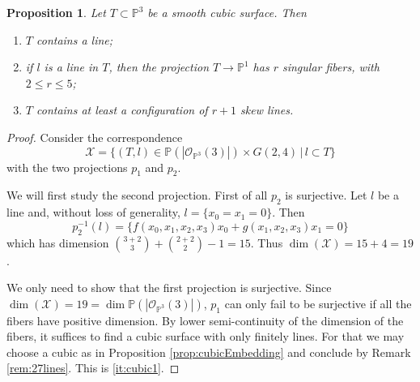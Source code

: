 \documentclass[a4paper,11pt]{amsart}
\newtheorem{proposition}[theorem]{Proposition}
\def\dim{\operatorname{dim}}
\newcommand{\OO}{\mathcal{O}}
\newcommand{\PP}{\mathbb{P}}
\begin{document}
\begin{proposition}\label{prop:cubic}
	Let $T \subset \PP^3$ be a smooth cubic surface.
	Then
	\begin{enumerate}
		\item\label{it:cubic1} $T$ contains a line;
		\item\label{it:cubic2} if $l$ is a line in $T$, then the projection $T \to \PP^1$ has $r$ singular fibers, with $2\leq r\leq 5$;
		\item\label{it:cubic3} $T$ contains at least a configuration of $r+1$ skew lines.
	\end{enumerate}
\end{proposition}

\begin{proof}
	Consider the correspondence
	\[
	\mathcal{X} = \big\{(T,l) \in \PP\left(|\OO_{\PP^3}(3)|\right) \times G(2,4) \,\big|\, l\subset T \big\}
	\]
	with the two projections $p_1$ and $p_2$.
	
	We will first study the second projection.
	First of all $p_2$ is surjective.
	Let $l$ be a line and, without loss of generality, $l = \{x_0 = x_1 = 0\}$.
	Then
	\[
	p_2^{-1}(l) = \{ f(x_0,x_1,x_2,x_3)x_0 + g(x_1,x_2,x_3)x_1 = 0 \}
	\]
	which has dimension $\binom{3+2}{3} + \binom{2+2}{2} -1 = 15$.
	Thus $\dim(\mathcal{X}) = 15 + 4 = 19$.
	
	We only need to show that the first projection is surjective.
	Since $\dim(\mathcal{X}) = 19 = \dim\PP\left(|\OO_{\PP^3}(3)|\right)$, $p_1$ can only fail to be surjective if all the fibers have positive dimension.
	By lower semi-continuity of the dimension of the fibers, it suffices to find a cubic surface with only finitely lines.
	For that we may choose a cubic as in Proposition \ref{prop:cubicEmbedding} and conclude by Remark \ref{rem:27lines}.
	This is \eqref{it:cubic1}.
	

\end{proof}
\end{document}
